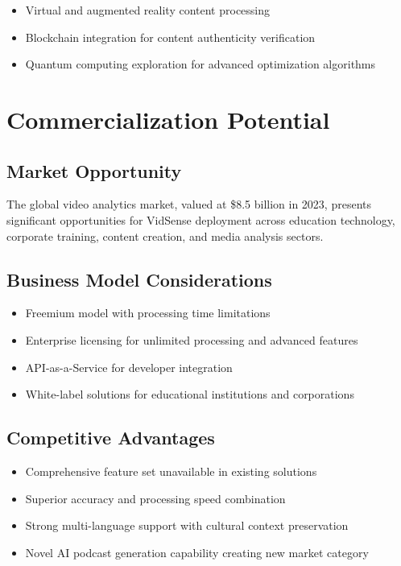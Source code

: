 \documentclass{bscs}
\begin{document}
\begin{itemize}
\item Virtual and augmented reality content processing
\item Blockchain integration for content authenticity verification
\item Quantum computing exploration for advanced optimization algorithms
\end{itemize}

\section{Commercialization Potential}

\subsection{Market Opportunity}

The global video analytics market, valued at \$8.5 billion in 2023, presents significant opportunities for VidSense deployment across education technology, corporate training, content creation, and media analysis sectors.

\subsection{Business Model Considerations}

\begin{itemize}
\item Freemium model with processing time limitations
\item Enterprise licensing for unlimited processing and advanced features
\item API-as-a-Service for developer integration
\item White-label solutions for educational institutions and corporations
\end{itemize}

\subsection{Competitive Advantages}

\begin{itemize}
\item Comprehensive feature set unavailable in existing solutions
\item Superior accuracy and processing speed combination
\item Strong multi-language support with cultural context preservation
\item Novel AI podcast generation capability creating new market category
\end{itemize}
\end{document}
